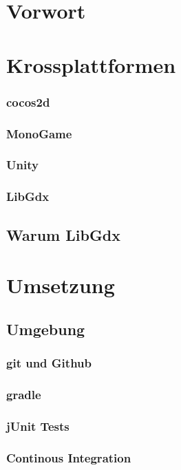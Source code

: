 \section{Vorwort}
\section{Krossplattformen}
		\subsubsection{cocos2d}
		\subsubsection{MonoGame}
		\subsubsection{Unity}
		\subsubsection{LibGdx}
	\subsection{Warum LibGdx}
\section{Umsetzung}
	\subsection{Umgebung}
		\subsubsection{git und Github}
		\subsubsection{gradle}
		\subsubsection{jUnit Tests}
		\subsubsection{Continous Integration}
